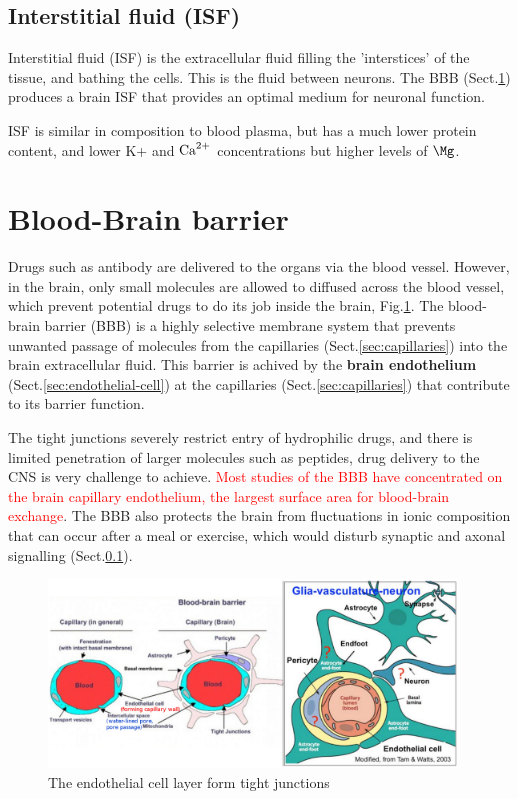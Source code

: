 \subsection{Interstitial fluid (ISF)}
\label{sec:ISF}

Interstitial fluid (ISF) is the extracellular fluid filling the 'interstices'
of the tissue, and bathing the cells. This is the fluid between neurons.
The BBB (Sect.\ref{sec:blood-brain-barrier}) produces a brain ISF that provides
an optimal medium for neuronal function.

ISF is similar in composition to blood plasma, but has a much lower protein
content, and lower K+ and ${\text{Ca}^{2+}}$ concentrations but higher levels of $\Mg$.


\section{Blood-Brain barrier}
\label{sec:blood-brain-barrier}



Drugs such as antibody are delivered to the organs via the blood vessel.
However, in the brain, only small molecules are allowed to diffused across the
blood vessel, which prevent potential drugs to do its job inside the brain,
Fig.\ref{fig:blood-brain-barrier}. The blood-brain barrier (BBB) is a highly
selective membrane system that prevents unwanted passage of molecules from the capillaries
(Sect.\ref{sec:capillaries}) into the brain extracellular fluid.
This barrier is achived by the {\bf brain endothelium}
(Sect.\ref{sec:endothelial-cell}) at the capillaries
(Sect.\ref{sec:capillaries}) that contribute to its barrier function.

The tight junctions severely restrict entry of hydrophilic drugs, and there is
limited penetration of larger molecules such as peptides, drug delivery to the
CNS is very challenge to achieve.
\textcolor{red}{Most studies of the BBB have concentrated on the brain capillary
endothelium, the largest surface area for blood-brain exchange}.
The BBB also protects the brain from fluctuations in ionic composition that can
occur after a meal or exercise, which would disturb synaptic and axonal
signalling (Sect.\ref{sec:ISF}).

\begin{figure}[hbt]
  \centerline{\includegraphics[height=5cm,
    angle=0]{./images/blood-brain-barrier.eps}}
\caption{The endothelial cell layer form tight junctions}
\label{fig:blood-brain-barrier}
\end{figure}


